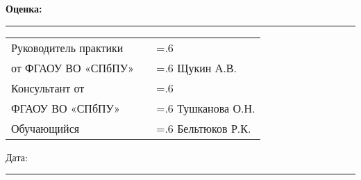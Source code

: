 \documentclass[12pt,a4paper]{extreport}
\begin{document}
\begin{flushleft}
		\textbf{Оценка: }\rule{19ex}{0.5pt}
		\vspace{20pt}

		\begin{tabularx}{\linewidth}{@{} XX>{\hsize=.6\hsize}X}
			Руководитель практики \\
			от ФГАОУ ВО «СПбПУ»
			&
			&
			Щукин А.В. 
%
			\vspace{10pt} \\
			Консультант от \\
			ФГАОУ ВО «СПбПУ»
%
			&
			&
			Тушканова О.Н.
%
			\vspace{12pt} \\
			Обучающийся
			&
			&
			Бельтюков Р.К.
%
		\end{tabularx}
		\vspace{20pt}
		
		Дата: \rule{10ex}{0.5pt}
	\end{flushleft}
\end{document}
